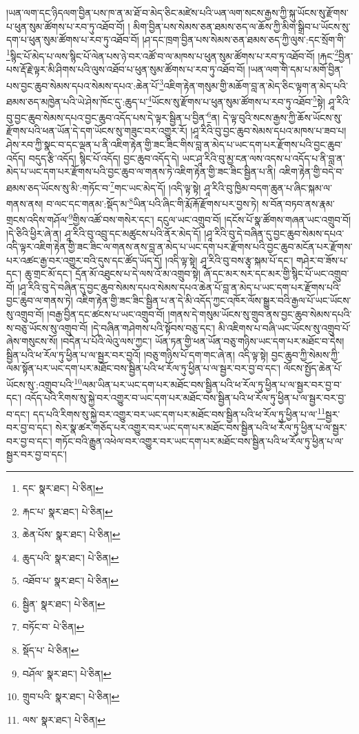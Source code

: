 །ཡན་ལག་དང་ཉིདལག་བྱིན་པས་ཁ་ན་མ་ཐོ་བ་མེད་ཅིང་མཛེས་པའི་ཡན་ལག་སངས་རྒྱས་ཀྱི་སྐུ་ཡོངས་སུ་རྫོགས་པ་ཕུན་སུམ་ཚོགས་པ་རབ་ཏུ་འཐོབ་བོ། །
མིག་བྱིན་པས་སེམས་ཅན་ཐམས་ཅད་ལ་ཆོས་ཀྱི་མིག་སྒྲིབ་པ་ཡོངས་སུ་དག་པ་ཕུན་སུམ་ཚོགས་པ་རབ་ཏུ་འཐོབ་བོ། །ཤ་དང་ཁྲག་བྱིན་པས་སེམས་ཅན་ཐམས་ཅད་ཀྱི་ལུས་:དང་སྲོག་གི་\footnote{དང་  སྣར་ཐང་།  པེ་ཅིན། }སྙིང་པོ་མེད་པ་ལས་སྙིང་པོ་ལེན་པས་ཉེ་བར་འཚོ་བ་ལ་མཁས་པ་ཕུན་སུམ་ཚོགས་པ་རབ་ཏུ་འཐོབ་བོ། །རྐང་\footnote{རྐང་པ་  སྣར་ཐང་།  པེ་ཅིན། }བྱིན་པས་རྡོ་རྗེ་ལྟར་མི་ཤིགས་པའི་ལུས་འཐོབ་པ་ཕུན་སུམ་ཚོགས་པ་རབ་ཏུ་འཐོབ་བོ། །ཡན་ལག་གི་དམ་པ་མགོ་བྱིན་པས་བྱང་ཆུབ་སེམས་དཔའ་སེམས་དཔའ་:ཆེན་པོ་\footnote{ཆེན་པོས་  སྣར་ཐང་།  པེ་ཅིན། }འཇིག་རྟེན་གསུམ་གྱི་མཆོག་བླ་ན་མེད་ཅིང་ལྟག་ན་མེད་པའི་ཐམས་ཅད་མཁྱེན་པའི་ཡེ་ཤེས་ཁོང་དུ་:ཆུད་པ་\footnote{ཆུད་པའི་  སྣར་ཐང་།  པེ་ཅིན། }ཡོངས་སུ་རྫོགས་པ་ཕུན་སུམ་ཚོགས་པ་རབ་ཏུ་འཐོབ་\footnote{འཐོབ་པ་  སྣར་ཐང་།  པེ་ཅིན། }སྟེ། ཤཱ་རིའི་བུ་བྱང་ཆུབ་སེམས་དཔའ་བྱང་ཆུབ་འདོད་པས་དེ་ལྟར་སྦྱིན་པ་བྱིན་\footnote{སྦྱིན་  སྣར་ཐང་།  པེ་ཅིན། }ན། དེ་ལྟ་བུའི་སངས་རྒྱས་ཀྱི་ཆོས་ཡོངས་སུ་རྫོགས་པའི་ཕན་ཡོན་དེ་དག་ཡོངས་སུ་གཟུང་བར་འགྱུར་རོ། །ཤཱ་རིའི་བུ་བྱང་ཆུབ་སེམས་དཔའ་མཁས་པ་ཟབ་པ། ཤེས་རབ་ཀྱི་སྣང་བ་དང་ལྡན་པ་ནི་འཇིག་རྟེན་གྱི་ཟང་ཟིང་གིས་བླ་ན་མེད་པ་ཡང་དག་པར་རྫོགས་པའི་བྱང་ཆུབ་འདོད། བདུད་རྩི་འདོད། སྙིང་པོ་འདོད། བྱང་ཆུབ་འདོད་དེ། ཡང་ཤཱ་རིའི་བུ་མྱ་ངན་ལས་འདས་པ་འདོད་པ་ནི་བླ་ན་མེད་པ་ཡང་དག་པར་རྫོགས་པའི་བྱང་ཆུབ་ལ་གནས་ཏེ་འཇིག་རྟེན་གྱི་ཟང་ཟིང་སྦྱིན་པ་ནི། འཇིག་རྟེན་གྱི་བདེ་བ་ཐམས་ཅད་ཡོངས་སུ་མི་:གཏོང་བ་\footnote{བཏོང་བ་  པེ་ཅིན། }གང་ཡང་མེད་དོ། །འདི་ལྟ་སྟེ། ཤཱ་རིའི་བུ་ཁྱིམ་བདག་ཆུན་པ་ཞིང་སྐམ་ལ་གནས་ནས། བ་ལང་དང་གནམ་:སྡོད་མ་\footnote{སྡོད་པ་  པེ་ཅིན། }ཡིན་པའི་ཞིང་གི་རྨོ་རྐོ་རྫོགས་པར་བྱས་ཏེ། ས་བོན་བཏབ་ནས་རྣམ་གྲངས་འདིས་གཤོལ་\footnote{བཤོལ་  སྣར་ཐང་།  པེ་ཅིན། }གྱིས་འཚོ་བས་གསེར་དང་། དངུལ་ཡང་འགྲུབ་བོ། །དངོས་པོ་སྣ་ཚོགས་གཞན་ཡང་འགྲུབ་བོ། །དེ་ཅིའི་ཕྱིར་ཞེ་ན། ཤཱ་རིའི་བུ་འབྲུ་དང་མཚུངས་པའི་ནོར་མེད་དོ། །ཤཱ་རིའི་བུ་དེ་བཞིན་དུ་བྱང་ཆུབ་སེམས་དཔའ་འདི་ལྟར་འཇིག་རྟེན་གྱི་ཟང་ཟིང་ལ་གནས་ནས་བླ་ན་མེད་པ་ཡང་དག་པར་རྫོགས་པའི་བྱང་ཆུབ་མངོན་པར་རྫོགས་པར་འཚང་རྒྱ་བར་འགྱུར་བའི་དུས་དང་ཚོད་ཡོད་དོ། །འདི་ལྟ་སྟེ། ཤཱ་རིའི་བུ་བས་རྩྭ་སྐམ་པོ་དང་། གཤེར་བ་ཟོས་པ་དང་། ཆུ་གྲང་མོ་དང་། དྲོན་མོ་འཐུངས་པ་དེ་ལས་འོ་མ་འགྲུབ་སྟེ། ཞོ་དང་མར་སར་དང་མར་གྱི་སྙིང་པོ་ཡང་འགྲུབ་བོ། །ཤཱ་རིའི་བུ་དེ་བཞིན་དུ་བྱང་ཆུབ་སེམས་དཔའ་སེམས་དཔའ་ཆེན་པོ་བླ་ན་མེད་པ་ཡང་དག་པར་རྫོགས་པའི་བྱང་ཆུབ་ལ་གནས་ཏེ། འཇིག་རྟེན་གྱི་ཟང་ཟིང་སྦྱིན་པ་ན་དེ་མི་འདོད་ཀྱང་འཁོར་ལོས་སྒྱུར་བའི་རྒྱལ་པོ་ཡང་ཡོངས་སུ་འགྲུབ་བོ། །བརྒྱ་བྱིན་དང་ཚངས་པ་ཡང་འགྲུབ་བོ། །གནས་དེ་གསུམ་ཡོངས་སུ་གྲུབ་ནས་བྱང་ཆུབ་སེམས་དཔའི་ས་བཅུ་ཡོངས་སུ་འགྲུབ་བོ། །དེ་བཞིན་གཤེགས་པའི་སྟོབས་བཅུ་དང་། མི་འཇིགས་པ་བཞི་ཡང་ཡོངས་སུ་འགྲུབ་པོ་ཞེས་གསུངས་སོ། །བདེན་པ་པོའི་ལེའུ་ལས་ཀྱང་། ཡོན་ཏན་གྱི་ཕན་ཡོན་བཅུ་གཉིས་ཡང་དག་པར་མཐོང་བ་དེས། སྦྱིན་པའི་ཕ་རོལ་ཏུ་ཕྱིན་པ་ལ་སྦྱར་བར་བྱའོ། །བཅུ་གཉིས་པོ་དག་གང་ཞེ་ན། འདི་ལྟ་སྟེ། བྱང་ཆུབ་ཀྱི་སེམས་ཀྱི་ལམ་སྟོན་པར་ཡང་དག་པར་མཐོང་བས་སྦྱིན་པའི་ཕ་རོལ་ཏུ་ཕྱིན་པ་ལ་སྦྱར་བར་བྱ་བ་དང་། ལོངས་སྤྱོད་ཆེན་པོ་ཡོངས་སུ་:འགྲུབ་པའི་\footnote{གྲུབ་པའི་  སྣར་ཐང་།  པེ་ཅིན། }ལམ་ཡིན་པར་ཡང་དག་པར་མཐོང་བས་སྦྱིན་པའི་ཕ་རོལ་ཏུ་ཕྱིན་པ་ལ་སྦྱར་བར་བྱ་བ་དང་། འདོད་པའི་རིགས་སུ་སྐྱེ་བར་འགྱུར་བ་ཡང་དག་པར་མཐོང་བས་སྦྱིན་པའི་ཕ་རོལ་ཏུ་ཕྱིན་པ་ལ་སྦྱར་བར་བྱ་བ་དང་། དད་པའི་རིགས་སུ་སྐྱེ་བར་འགྱུར་བར་ཡང་དག་པར་མཐོང་བས་སྦྱིན་པའི་ཕ་རོལ་ཏུ་ཕྱིན་པ་ལ་\footnote{ལས་  སྣར་ཐང་།  པེ་ཅིན། }སྦྱར་བར་བྱ་བ་དང་། སེར་སྣ་ཚར་གཅོད་པར་འགྱུར་བར་ཡང་དག་པར་མཐོང་བས་སྦྱིན་པའི་ཕ་རོལ་ཏུ་ཕྱིན་པ་ལ་སྦྱར་བར་བྱ་བ་དང་། གཏོང་བའི་རྒྱུན་འཕེལ་བར་འགྱུར་བར་ཡང་དག་པར་མཐོང་བས་སྦྱིན་པའི་ཕ་རོལ་ཏུ་ཕྱིན་པ་ལ་སྦྱར་བར་བྱ་བ་དང་། 